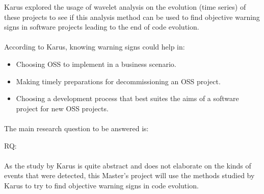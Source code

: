 Karus explored the usage of wavelet analysis on the evolution (time series) of
these projects to see if this analysis method can be used to find objective
warning signs in software projects leading to the end of code evolution.

\paragraph{}
According to Karus, knowing warning signs could help in:
\begin{itemize}
	\item Choosing OSS to implement in a business scenario.
	\item Making timely preparations for decommissioning an OSS project.
	\item Choosing a development process that best suites the aims of a software
	project for new OSS projects.
\end{itemize}

\paragraph{}
The main research question to be answered is:
\begin{description}
	\item[RQ:] \emph{\researchQuestion}
\end{description}
\cite{karus2013}

\paragraph{}
As the study by Karus is quite abstract and does not elaborate on the kinds of
events that were detected, this Master's project will use the methods studied by
Karus to try to find objective warning signs in code evolution.

